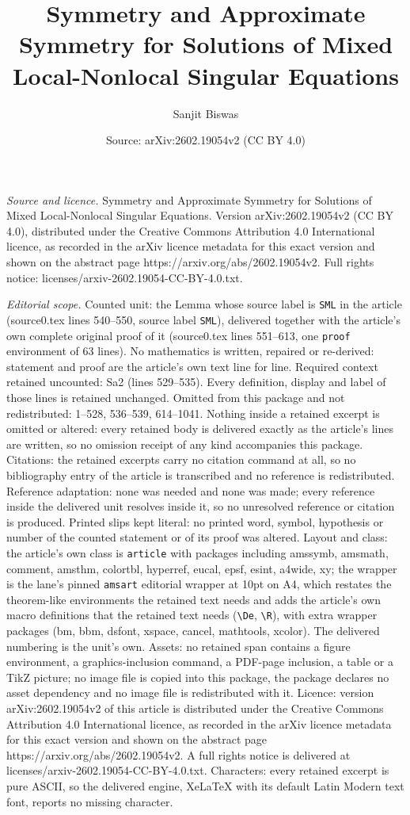\documentclass[10pt,a4paper]{amsart}
\title[Symmetry and Approximate Symmetry for Solutions of Mixed Loc]{Symmetry and Approximate Symmetry for Solutions of Mixed Local-Nonlocal Singular Equations}
\author{Sanjit Biswas}
\date{Source: arXiv:2602.19054v2 (CC BY 4.0)}
\begin{document}
\maketitle

\noindent\emph{Source and licence.} Symmetry and Approximate Symmetry for Solutions of Mixed Local-Nonlocal Singular Equations. Version arXiv:2602.19054v2 (CC BY 4.0), distributed under the Creative Commons Attribution 4.0 International licence, as recorded in the arXiv licence metadata for this exact version and shown on the abstract page https://arxiv.org/abs/2602.19054v2. Full rights notice: licenses/arxiv-2602.19054-CC-BY-4.0.txt.\par\smallskip

\noindent\textit{Editorial scope.} Counted unit: the Lemma whose source label is \texttt{SML} in the article (source0.tex lines 540--550, source label \texttt{SML}), delivered together with the article's own complete original proof of it (source0.tex lines 551--613, one \texttt{proof} environment of 63 lines). No mathematics is written, repaired or re-derived: statement and proof are the article's own text line for line. Required context retained uncounted: Sa2 (lines 529--535). Every definition, display and label of those lines is retained unchanged. Omitted from this package and not redistributed: 1--528, 536--539, 614--1041. Nothing inside a retained excerpt is omitted or altered: every retained body is delivered exactly as the article's lines are written, so no omission receipt of any kind accompanies this package. Citations: the retained excerpts carry no citation command at all, so no bibliography entry of the article is transcribed and no reference is redistributed. Reference adaptation: none was needed and none was made; every reference inside the delivered unit resolves inside it, so no unresolved reference or citation is produced. Printed slips kept literal: no printed word, symbol, hypothesis or number of the counted statement or of its proof was altered. Layout and class: the article's own class is \texttt{article} with packages including amssymb, amsmath, comment, amsthm, colortbl, hyperref, eucal, epsf, esint, a4wide, xy; the wrapper is the lane's pinned \texttt{amsart} editorial wrapper at 10pt on A4, which restates the theorem-like environments the retained text needs and adds the article's own macro definitions that the retained text needs (\texttt{\textbackslash De}, \texttt{\textbackslash R}), with extra wrapper packages (bm, bbm, dsfont, xspace, cancel, mathtools, xcolor). The delivered numbering is the unit's own. Assets: no retained span contains a figure environment, a graphics-inclusion command, a PDF-page inclusion, a table or a TikZ picture; no image file is copied into this package, the package declares no asset dependency and no image file is redistributed with it. Licence: version arXiv:2602.19054v2 of this article is distributed under the Creative Commons Attribution 4.0 International licence, as recorded in the arXiv licence metadata for this exact version and shown on the abstract page https://arxiv.org/abs/2602.19054v2. A full rights notice is delivered at licenses/arxiv-2602.19054-CC-BY-4.0.txt. Characters: every retained excerpt is pure ASCII, so the delivered engine, XeLaTeX with its default Latin Modern text font, reports no missing character.
\end{document}

